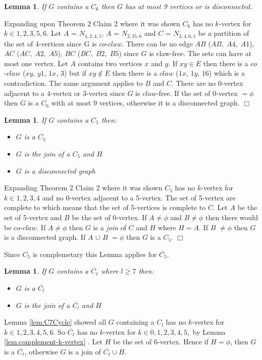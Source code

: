 \documentclass[12pt]{article}
\newtheorem{Lemma}[Theorem]{Lemma}
\begin{document}
\begin{Lemma}\label{lem:C69V}
If $G$ contains a $C_6$ then $G$ has at most 9 vertices or is disconnected.
\end{Lemma}
 Expanding \cite{BraFud2002} upon Theorem 2 Claim 2 where it was shown $C_6$ has no $k$-vertex for $k \in {1, 2, 3, 5, 6}$. Let $A$ = $N_{1,2,4,5}$, $A$ = $N_{2,35,6}$ and $C$ = $N_{3,4,6,1}$ be a partition of the set of 4-vertices since G is $co$-$claw$. There can be no edge $AB$ ($AB,\;A4,\;A1$), $AC$ ($AC,\;A2,\;A5$), $BC$ ($BC,\;B2,\;B5$) since $G$ is claw-free. The sets can have at most one vertex. Let $A$ contains two vertices $x$ and $y$. If $xy \in E$ then there is a $co$-$claw$ ($xy$, $y1$, $1x$, $3$) but if $xy \not\in E$ then there is a $claw$ ($1x$, $1y$, $16$) which is a contradiction. The same argument applies to $B$ and $C$. There are no $0$-vertex adjacent to a $4$-vertex or $3$-vertex since $G$ is $claw$-free. If the set of $0$-vertex $= \phi$ then $G$ is a $C_6$ with at most 9 vertices, otherwise it is a disconnected graph.  $\Box$



\medskip

\begin{Lemma}\label{lem:c5join}
If $G$ contains a $C_5$ then:
\begin{itemize}
\item[(i)]
$G$ is a $C_5$
\item[(i)]
$G$ is the join of a $C_5$ and $H$
\item[(i)]
$G$ is a disconnected graph
\end{itemize}
\end{Lemma}
 Expanding \cite{BraFud2002} Theorem 2 Claim 2 where it was shown $C_5$ has no $k$-vertex for $k \in {1,2,3,4}$ and no 0-vertex adjacent to a 5-vertex. The set of 5-vertex are complete to
 which means that the set of 5-vertices is complete to $C$. Let $A$ be the set of 5-vertex and $B$ be the set of 0-vertex. If $A \neq \phi$ and $B \neq \phi$ then there would be $co$-$claw$. If $A \neq \phi$ then $G$ is a {\it join} of $C$ and $H$ where $H = A$. If $B$ $\neq \phi$ then  $G$ is a disconnected graph. If $A$ $\cup$ $B$ $= \phi$ then $G$ is a $C_5$.  $\Box$

Since $C_5$ is complemetary this Lemma applies for $\overline{C_5}$.
\medskip

\begin{Lemma}\label{lem:co-cl}
If $G$ contains a $\overline{C_\ell}$ where $l \geq 7$ then:
\begin{itemize}
\item[(i)]
$G$ is a $\overline{C_l}$
\item[(i)]
$G$ is the join of a $\overline{C_l}$ and $H$
\end{itemize}
\end{Lemma}
 Lemma \ref{lem:C7Cycle} showed all $G$ containing a $C_l$ has no $k$-vertex for $k \in {1, 2, 3, 4, 5, 6}$. So $\overline{C_\ell}$ has no $k$-vertex for $k \in {0, 1, 2, 3, 4, 5,}$ by Lemma \ref{lem:complement-k-vertex} . Let $H$ be the set of 6-vertex. Hence if $H = \phi$, then $G$ is a $\overline{C_\ell}$, otherwise $G$ is a join of $\overline{C_\ell} \cup H$.
\end{document}
